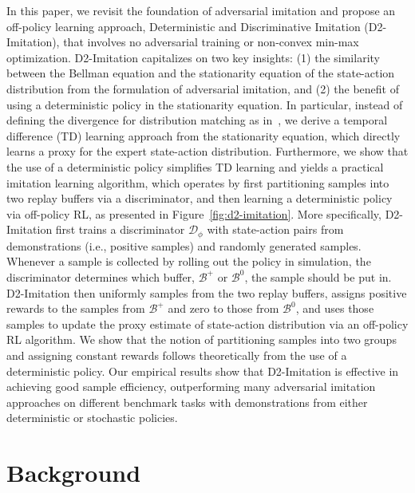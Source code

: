 \documentclass[letterpaper]{article} %
\begin{document}
In this paper, we revisit the foundation of adversarial imitation and propose an off-policy learning approach,
Deterministic and Discriminative Imitation (D2-Imitation), that involves no adversarial training or non-convex min-max optimization.
D2-Imitation capitalizes on two key insights: (1)
the similarity between the Bellman equation and the stationarity equation of the state-action distribution from the formulation of adversarial imitation,
and (2) the benefit of using a deterministic policy in the stationarity equation.
In particular, instead of defining the divergence for distribution matching as in~\citet{ho2016generative,ghasemipour2020divergence},
we derive a temporal difference (TD) learning approach from the stationarity equation, which directly learns a proxy for the expert state-action distribution.
Furthermore, we show that the use of a deterministic policy simplifies TD learning and yields a practical imitation learning algorithm,
which operates by first partitioning samples into two replay buffers via a discriminator,
and then learning a deterministic policy via off-policy RL,
as presented in Figure~\ref{fig:d2-imitation}.
More specifically,  D2-Imitation first trains a discriminator $\mathcal{D}_{\phi}$ with state-action pairs from demonstrations (i.e., positive samples) and randomly generated samples.
Whenever a sample is collected by rolling out the policy in simulation,
the discriminator determines which buffer, $\mathcal{B}^{+}$ or $\mathcal{B}^{0}$, the sample should be put in.
D2-Imitation then uniformly samples from the two replay buffers, assigns positive rewards to the samples from $\mathcal{B}^{+}$ and zero to those from $\mathcal{B}^{0}$,
and uses those samples to update the proxy estimate of state-action distribution via an off-policy RL algorithm.
We show that the notion of partitioning samples into two groups and assigning constant rewards follows theoretically from the use of a deterministic policy.
Our empirical results show that D2-Imitation is effective in achieving good sample efficiency, outperforming many adversarial imitation approaches on different benchmark tasks with demonstrations from either deterministic or stochastic policies.

\section{Background}
\end{document}
